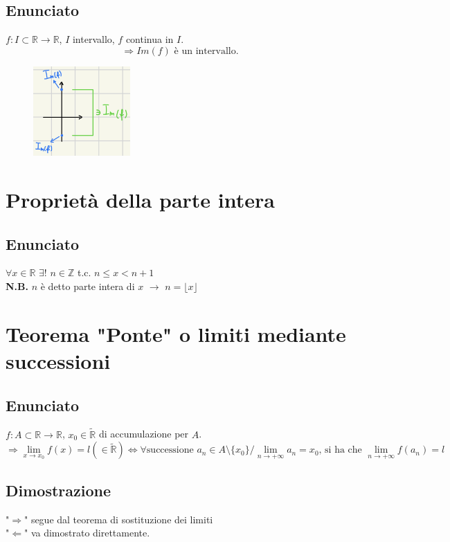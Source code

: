 \documentclass{article}
\newcommand{\R}{\mathbb{R}}
\newcommand{\Z}{\mathbb{Z}}
\newcommand{\Rext}{\widetilde{\mathbb{R}}}
\begin{document}
\begin{flushleft}
\subsection{Enunciato}
$f: I \subset \R \rightarrow \R$, $I$ intervallo, $f$ continua in $I$.
\[
\Rightarrow Im(f) \text{ è un intervallo.}
\]
\begin{figure}[h]
    \centering
    \includegraphics[width=10em]{./images/valori_intermedi.jpg}
\end{figure}
\FloatBarrier

\section{Proprietà della parte intera}
\subsection{Enunciato}
$\forall x \in \R$ $\exists !$ $ n \in \Z$ t.c. $ n \leq x < n + 1$\\
\textbf{N.B.} $n$ è detto parte intera di $x$ $\rightarrow$ $n = \lfloor x \rfloor$

\section{Teorema "Ponte" o limiti mediante successioni}
\subsection{Enunciato}
$f:A \subset \R \rightarrow \R$, $x_0 \in \Rext$ di accumulazione per $A$.\\
\[
\Rightarrow \lim\limits_{x \to x_0}f(x) = l(\in \Rext) \iff \forall \text{successione } a_n \in A \setminus \{x_0\}/\lim\limits_{n \to + \infty}a_n = x_0 \text{, si ha che } \lim\limits_{n \to + \infty} f(a_n)=l
\]
\subsection{Dimostrazione}
"$\Rightarrow$" segue dal teorema di sostituzione dei limiti\\
"$\Leftarrow$" va dimostrato direttamente.


\end{flushleft}
\end{document}
